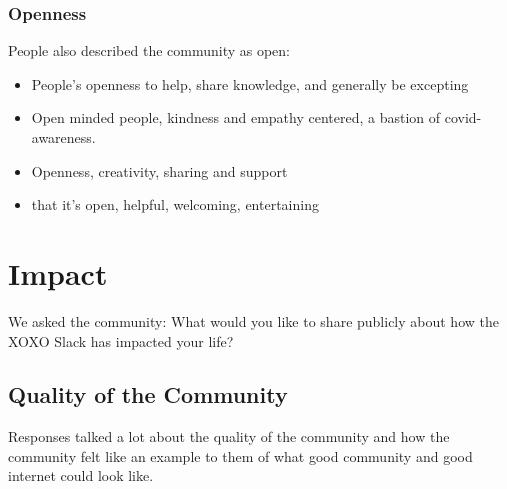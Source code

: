 \documentclass[
]{book}
\providecommand{\tightlist}{%
  \setlength{\itemsep}{0pt}\setlength{\parskip}{0pt}}
\begin{document}
\subsection{Openness}\label{openness}

People also described the community as open:

\begin{itemize}
\tightlist
\item
  People's openness to help, share knowledge, and generally be excepting
\item
  Open minded people, kindness and empathy centered, a bastion of covid-awareness.
\item
  Openness, creativity, sharing and support
\item
  that it's open, helpful, welcoming, entertaining
\end{itemize}

\chapter{Impact}\label{impact}

We asked the community: What would you like to share publicly about how the XOXO Slack has impacted your life?

\section{Quality of the Community}\label{quality-of-the-community}

Responses talked a lot about the quality of the community and how the community felt like an example to them of what good community and good internet could look like.
\end{document}
